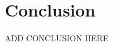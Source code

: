 \documentclass[../main.tex]{subfiles}
\begin{document}
\section{Conclusion}
\label{sec:conclusion}
ADD CONCLUSION HERE
\end{document}
